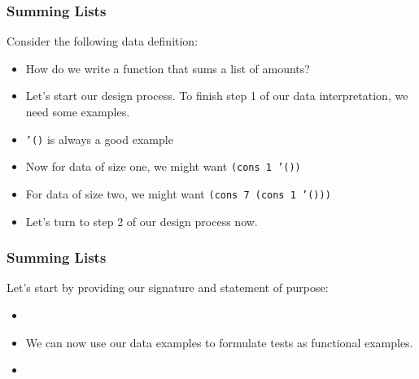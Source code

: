 \documentclass{beamer}
\begin{document}
\begin{frame}
  \frametitle{Summing Lists}
  Consider the following data definition:
  \ALoA
  \begin{itemize}
  \item<2-> How do we write a function that sums a list of amounts?
  \item<3-> Let's start our design process. To finish step 1 of
    our data interpretation, we need some examples.
  \item<4-> \texttt{'()} is always a good example
  \item<5-> Now for data of size one, we might want
    \texttt{(cons 1 '())}
  \item<6-> For data of size two, we might want
    \texttt{(cons 7 (cons 1 '()))}
  \item<7-> Let's turn to step 2 of our design process now.
  \end{itemize}
\end{frame}




\begin{frame}
  \frametitle{Summing Lists}
  Let's start by providing our signature and statement of purpose:
  \begin{itemize}
  \item<2-> \SumHeader
  \item<3-> We can now use our data examples to formulate tests
    as functional examples.
  \item<4-> \SumTests
  \end{itemize}
\end{frame}
\end{document}
